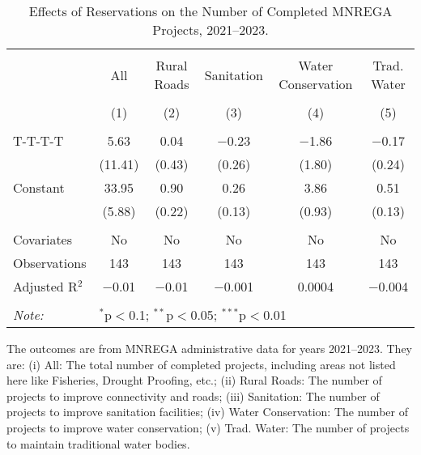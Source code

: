 \begin{table}[!htbp]
\centering
\begin{threeparttable}

  \caption{Effects of Reservations on the Number of Completed MNREGA Projects, 2021--2023.} 
  \label{main_mnrega_2011_2023} 
\scriptsize 
\begin{tabular}{@{\extracolsep{0pt}}lccccc} 
\\[-1.8ex]\hline 
\hline \\[-1.8ex] 
 & All & Rural Roads & Sanitation & Water Conservation & Trad. Water \\ 
\\[-1.8ex] & (1) & (2) & (3) & (4) & (5)\\ 
\hline \\[-1.8ex] 
 T-T-T-T & 5.63 & 0.04 & $-$0.23 & $-$1.86 & $-$0.17 \\ 
  & (11.41) & (0.43) & (0.26) & (1.80) & (0.24) \\ 
  Constant & 33.95 & 0.90 & 0.26 & 3.86 & 0.51 \\ 
  & (5.88) & (0.22) & (0.13) & (0.93) & (0.13) \\ 
 \hline \\[-1.8ex] 
Covariates & No & No & No & No & No \\ 
Observations & 143 & 143 & 143 & 143 & 143 \\ 
Adjusted R$^{2}$ & $-$0.01 & $-$0.01 & $-$0.001 & 0.0004 & $-$0.004 \\ 
\hline 
\hline \\[-1.8ex] 
\textit{Note:}  & \multicolumn{5}{l}{$^{*}$p$<$0.1; $^{**}$p$<$0.05; $^{***}$p$<$0.01} \\ 
\end{tabular} 
\begin{tablenotes}[flushleft]
\scriptsize
\item The outcomes are from MNREGA administrative data for years 2021--2023. They are: 
(i) All: The total number of completed projects, including areas not listed here like Fisheries, Drought Proofing, etc.;
(ii) Rural Roads: The number of projects to improve connectivity and roads;
(iii) Sanitation: The number of projects to improve sanitation facilities;
(iv) Water Conservation: The number of projects to improve water conservation;
(v) Trad. Water: The number of projects to maintain traditional water bodies.
\end{tablenotes}
\end{threeparttable}
\end{table}
